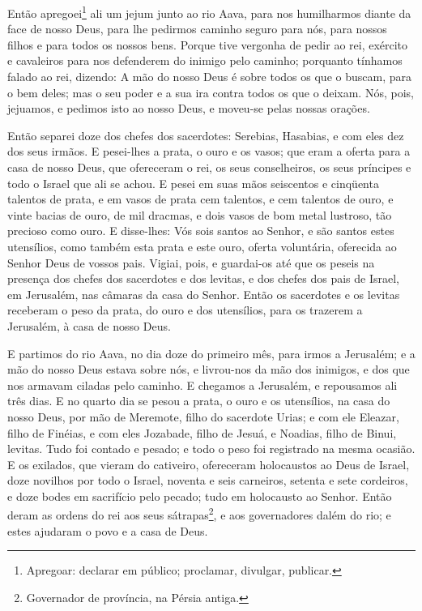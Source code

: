 Então apregoei\footnote{Apregoar: declarar em público; proclamar,
divulgar, publicar.} ali um jejum junto ao rio Aava, para nos
humilharmos diante da face de nosso Deus, para lhe pedirmos caminho
seguro para nós, para nossos filhos e para todos os nossos bens.
Porque tive vergonha de pedir ao rei, exército e cavaleiros
para nos defenderem do inimigo pelo caminho; porquanto tínhamos
falado ao rei, dizendo: A mão do nosso Deus é sobre todos os que o
buscam, para o bem deles; mas o seu poder e a sua ira contra todos
os que o deixam. Nós, pois, jejuamos, e pedimos isto ao nosso
Deus, e moveu-se pelas nossas orações.

Então separei doze dos chefes dos sacerdotes: Serebias, Hasabias,
e com eles dez dos seus irmãos. E pesei-lhes a prata, o ouro
e os vasos; que eram a oferta para a casa de nosso Deus, que
ofereceram o rei, os seus conselheiros, os seus príncipes e todo o
Israel que ali se achou. E pesei em suas mãos seiscentos e
cinqüenta talentos de prata, e em vasos de prata cem talentos, e cem
talentos de ouro, e vinte bacias de ouro, de mil dracmas, e
dois vasos de bom metal lustroso, tão precioso como ouro. E
disse-lhes: Vós sois santos ao Senhor, e são santos estes
utensílios, como também esta prata e este ouro, oferta voluntária,
oferecida ao Senhor Deus de vossos pais. Vigiai, pois, e
guardai-os até que os peseis na presença dos chefes dos sacerdotes e
dos levitas, e dos chefes dos pais de Israel, em Jerusalém, nas
câmaras da casa do Senhor. Então os sacerdotes e os levitas
receberam o peso da prata, do ouro e dos utensílios, para os
trazerem a Jerusalém, à casa de nosso Deus.

E partimos do rio Aava, no dia doze do primeiro mês, para irmos a
Jerusalém; e a mão do nosso Deus estava sobre nós, e livrou-nos da
mão dos inimigos, e dos que nos armavam ciladas pelo caminho.
E chegamos a Jerusalém, e repousamos ali três dias. E
no quarto dia se pesou a prata, o ouro e os utensílios, na casa do
nosso Deus, por mão de Meremote, filho do sacerdote Urias; e com ele
Eleazar, filho de Finéias, e com eles Jozabade, filho de Jesuá, e
Noadias, filho de Binui, levitas. Tudo foi contado e pesado;
e todo o peso foi registrado na mesma ocasião. E os exilados,
que vieram do cativeiro, ofereceram holocaustos ao Deus de Israel,
doze novilhos por todo o Israel, noventa e seis carneiros, setenta e
sete cordeiros, e doze bodes em sacrifício pelo pecado; tudo em
holocausto ao Senhor. Então deram as ordens do rei aos seus
sátrapas\footnote{Governador de província, na Pérsia antiga.}, e aos
governadores dalém do rio; e estes ajudaram o povo e a casa de Deus.

